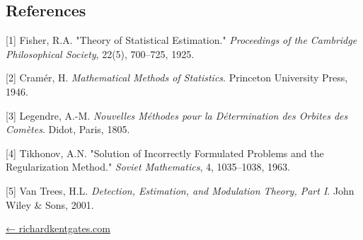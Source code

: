 \documentclass[
  10pt,
]{article}
\begin{document}
\hypertarget{references}{%
\subsection{References}\label{references}}

{[}1{]} Fisher, R.A. "Theory of Statistical Estimation."
\emph{Proceedings of the Cambridge Philosophical Society}, 22(5),
700--725, 1925.

{[}2{]} Cramér, H. \emph{Mathematical Methods of Statistics}. Princeton
University Press, 1946.

{[}3{]} Legendre, A.-M. \emph{Nouvelles Méthodes pour la Détermination
des Orbites des Comètes}. Didot, Paris, 1805.

{[}4{]} Tikhonov, A.N. "Solution of Incorrectly Formulated Problems and
the Regularization Method." \emph{Soviet Mathematics}, 4, 1035--1038,
1963.

{[}5{]} Van Trees, H.L. \emph{Detection, Estimation, and Modulation
Theory, Part I}. John Wiley \& Sons, 2001.

\href{https://richardkentgates.com/}{← richardkentgates.com}
\end{document}
